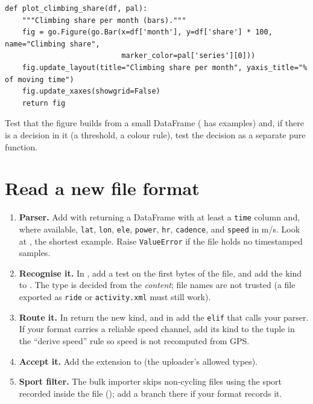 \begin{lstlisting}
def plot_climbing_share(df, pal):
    """Climbing share per month (bars)."""
    fig = go.Figure(go.Bar(x=df['month'], y=df['share'] * 100, name="Climbing share",
                           marker_color=pal['series'][0]))
    fig.update_layout(title="Climbing share per month", yaxis_title="% of moving time")
    fig.update_xaxes(showgrid=False)
    return fig
\end{lstlisting}

Test that the figure builds from a small DataFrame ( has examples) and, if there is a
decision in it (a threshold, a colour rule), test the decision as a separate pure function.

\section{Read a new file format}\label{rec:format}

\begin{enumerate}
\item \textbf{Parser.} Add  with  returning a DataFrame with
  at least a \texttt{time} column and, where available, \texttt{lat}, \texttt{lon}, \texttt{ele}, \texttt{power},
  \texttt{hr}, \texttt{cadence}, and \texttt{speed} in m/s. Look at , the shortest example. Raise
  \texttt{ValueError} if the file holds no timestamped samples.
\item \textbf{Recognise it.} In , add a test on the first bytes of the file, and add the
  kind to . The type is decided from the \emph{content}; file names are not trusted
  (a file exported as \texttt{ride} or \texttt{activity.xml} must still work).
\item \textbf{Route it.} In  return the new kind, and in  add
  the \texttt{elif} that calls your parser. If your format carries a reliable speed channel, add its kind to the
  tuple in the ``derive speed'' rule so speed is not recomputed from GPS.
\item \textbf{Accept it.} Add the extension to  (the uploader's allowed types).
\item \textbf{Sport filter.} The bulk importer skips non-cycling files using the sport recorded inside the file
  (); add a branch there if your format records it.
\end{enumerate}

